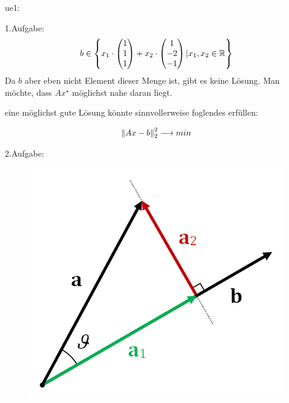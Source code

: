 ue1:

1.Aufgabe:
\begin{equation}
\begin{split}
	b \in \left\{ x_1 \cdot \begin{pmatrix*} 1\\ 1\\ 1 \end{pmatrix*} + x_2 \cdot \begin{pmatrix*} 1\\ -2\\ -1 \end{pmatrix*} | x_1, x_2 \in \R \right\}
\end{split}
\end{equation}
Da $b$ aber eben nicht Element dieser Menge ist, gibt es keine Lösung.
Man möchte, dass $Ax^\star$ möglichst nahe daran liegt.


eine möglichst \glqq gute\grqq{} Lösung könnte sinnvollerweise foglendes erfüllen:

\[
\left\lVert Ax-b\right\rVert^2_2 \longrightarrow min
\]

2.Aufgabe:
\begin{figure}[ht]
	\centering
	\includegraphics[scale=.3]{Projection_and_rejection.png}
\end{figure}

